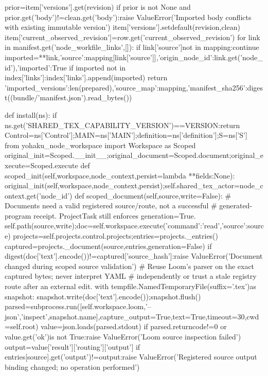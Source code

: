             prior=item['versions'].get(revision)
            if prior is not None and prior.get('body')!=clean.get('body'):raise ValueError('Imported body conflicts with existing immutable version')
            item['versions'].setdefault(revision,clean)
            item['current_observed_revision']=row.get('current_observed_revision')
        for link in manifest.get('node_workfile_links',[]):
            if link['source']not in mapping:continue
            imported={**link,'source':mapping[link['source']],'origin_node_id':link.get('node_id'),'imported':True}
            if imported not in index['links']:index['links'].append(imported)
    return {'imported_versions':len(prepared),'source_map':mapping,'manifest_sha256':digest((bundle/'manifest.json').read_bytes())}

def install(ns):
    if ns.get('SHARED_TEX_CAPABILITY_VERSION')==VERSION:return
    Control=ns['Control'];MAIN=ns['MAIN'];definition=ns['definition'];S=ns['S']
    from yohaku_node_workspace import Workspace as Scoped
    original_init=Scoped.__init__;original_document=Scoped.document;original_execute=Scoped.execute
    def scoped_init(self,workspace,node_context,persist=lambda **fields:None):
        original_init(self,workspace,node_context,persist);self.shared_tex_actor=node_context.get('node_id')
    def scoped_document(self,source,write=False):
        # Documents need a valid registered source/route, not a successful
        # generated-program receipt. ProjectTask still enforces generation=True.
        self.path(source,write);doc=self.workspace.execute({'command':'read','source':source})
        projects=self.projects.control.projects;entries=projects._entries()
        captured=projects._document(source,entries,generation=False)
        if digest(doc['text'].encode())!=captured['source_hash']:raise ValueError('Document changed during scoped source validation')
        # Reuse Loom's parser on the exact captured bytes; never interpret YAML
        # independently or trust a stale registry route after an external edit.
        with tempfile.NamedTemporaryFile(suffix='.tex')as snapshot:
            snapshot.write(doc['text'].encode());snapshot.flush()
            parsed=subprocess.run([self.workspace.loom,'--json','inspect',snapshot.name],capture_output=True,text=True,timeout=30,cwd=self.root)
        value=json.loads(parsed.stdout)
        if parsed.returncode!=0 or value.get('ok')is not True:raise ValueError('Loom source inspection failed')
        output=value['result']['routing']['output']
        if entries[source].get('output')!=output:raise ValueError('Registered source output binding changed; no operation performed')

